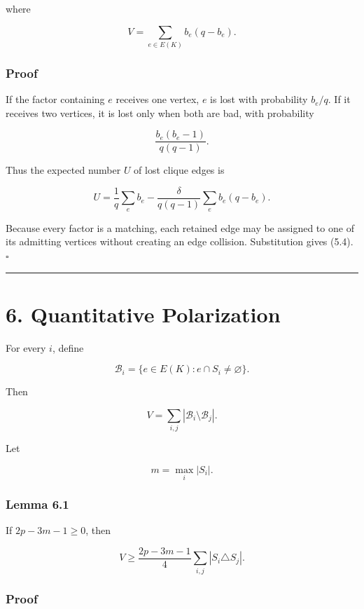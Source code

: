 \documentclass[
  11pt,
]{article}
\begin{document}
where

\[
V=\sum_{e\in E(K)}b_e(q-b_e).
\tag{5.5}
\]

\subsubsection{Proof}\label{proof-4}

If the factor containing \(e\) receives one vertex, \(e\) is lost with
probability \(b_e/q\). If it receives two vertices, it is lost only when
both are bad, with probability

\[
\frac{b_e(b_e-1)}{q(q-1)}.
\]

Thus the expected number \(U\) of lost clique edges is

\[
U
=
\frac1q\sum_e b_e
-
\frac{\delta}{q(q-1)}\sum_e b_e(q-b_e).
\]

Because every factor is a matching, each retained edge may be assigned
to one of its admitting vertices without creating an edge collision.
Substitution gives (5.4). \(\square\)

\begin{center}\rule{0.5\linewidth}{0.5pt}\end{center}

\section{6. Quantitative Polarization}\label{quantitative-polarization}

For every \(i\), define

\[
\mathcal B_i=\{e\in E(K):e\cap S_i\ne\varnothing\}.
\]

Then

\[
V=\sum_{i,j}|\mathcal B_i\setminus\mathcal B_j|.
\tag{6.1}
\]

Let

\[
m=\max_i|S_i|.
\]

\subsubsection{Lemma 6.1}\label{lemma-6.1-polarization-inequality}

If \(2p-3m-1\ge0\), then

\[
\boxed{
V
\ge
\frac{2p-3m-1}{4}
\sum_{i,j}|S_i\triangle S_j|.
}
\tag{6.2}
\]

\subsubsection{Proof}\label{proof-5}
\end{document}
